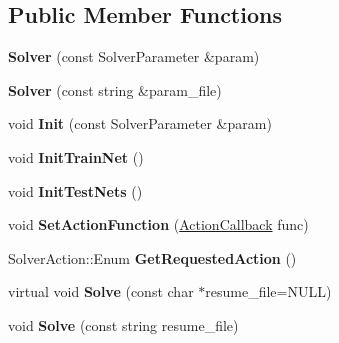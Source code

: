 \subsection*{Public Member Functions}
\begin{DoxyCompactItemize}
\item 
{\bfseries Solver} (const Solver\+Parameter \&param)\hypertarget{classcaffe_1_1Solver_a153266a021a077d1e4b53819cf558780}{}\label{classcaffe_1_1Solver_a153266a021a077d1e4b53819cf558780}

\item 
{\bfseries Solver} (const string \&param\+\_\+file)\hypertarget{classcaffe_1_1Solver_a8dea449cb5198e44b1ad975943ec0d64}{}\label{classcaffe_1_1Solver_a8dea449cb5198e44b1ad975943ec0d64}

\item 
void {\bfseries Init} (const Solver\+Parameter \&param)\hypertarget{classcaffe_1_1Solver_abf3071597032efde211e5b48cdcb99c5}{}\label{classcaffe_1_1Solver_abf3071597032efde211e5b48cdcb99c5}

\item 
void {\bfseries Init\+Train\+Net} ()\hypertarget{classcaffe_1_1Solver_a12e2bc3f5747c5e983f11d6c1dbe1256}{}\label{classcaffe_1_1Solver_a12e2bc3f5747c5e983f11d6c1dbe1256}

\item 
void {\bfseries Init\+Test\+Nets} ()\hypertarget{classcaffe_1_1Solver_a41e4eff217da272aa8dbc6f0d3bdd289}{}\label{classcaffe_1_1Solver_a41e4eff217da272aa8dbc6f0d3bdd289}

\item 
void {\bfseries Set\+Action\+Function} (\hyperlink{namespacecaffe_a79ce9ffbdd44b367252e0b8cf99bf430}{Action\+Callback} func)\hypertarget{classcaffe_1_1Solver_a4a90f66f516b986e873211fcbe340348}{}\label{classcaffe_1_1Solver_a4a90f66f516b986e873211fcbe340348}

\item 
Solver\+Action\+::\+Enum {\bfseries Get\+Requested\+Action} ()\hypertarget{classcaffe_1_1Solver_af31b33df3dd3ea3b689839c8cb2ed29e}{}\label{classcaffe_1_1Solver_af31b33df3dd3ea3b689839c8cb2ed29e}

\item 
virtual void {\bfseries Solve} (const char $\ast$resume\+\_\+file=N\+U\+LL)\hypertarget{classcaffe_1_1Solver_a20db89c708755c9a1e150df9d0a4b79c}{}\label{classcaffe_1_1Solver_a20db89c708755c9a1e150df9d0a4b79c}

\item 
void {\bfseries Solve} (const string resume\+\_\+file)\hypertarget{classcaffe_1_1Solver_ac0be56a22aebd71d012e751c9e97c7e6}{}\label{classcaffe_1_1Solver_ac0be56a22aebd71d012e751c9e97c7e6}


\end{DoxyCompactItemize}
